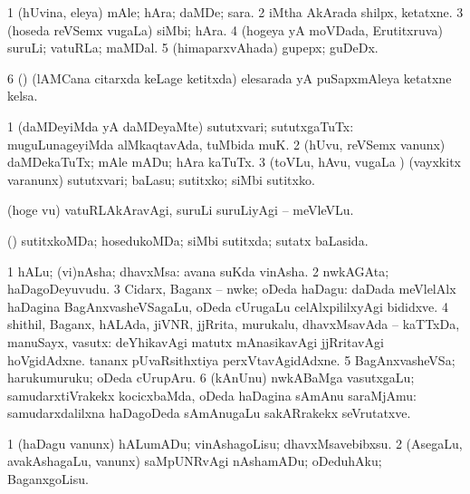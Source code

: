 {{{{{{\begin{center}
{{\bentry
{} 
\gl{\nA}
\bmng
\bnum
\num{1} (hUvina, eleya) mAle; hAra; daMDe; sara. 
\num{2} iMtha AkArada shilpx, ketatxne. 
\num{3} (hoseda reVSemx \mo vugaLa) siMbi; hAra. 
\num{4} (hogeya yA moVDada, Erutitxruva) suruLi; vatuRLa; maMDal. 
\num{5} (himaparxvAhada) gupepx; guDeDx. 
\num{6} (\vaMlAM) (lAMCana citarxda keLage ketitxda) elesarada yA puSapxmAleya ketatxne kelsa. 
\enum
\emng
\eentry

\bentry 
{} 
\gl{\sakirx}
\expl{}
\bmng
\bnum
\num{1} (daMDeyiMda yA daMDeyaMte) sututxvari; sututxgaTuTx:  muguLunageyiMda alMkaqtavAda, tuMbida muK. 
\num{2} (hUvu, reVSemx \mo vanunx) daMDekaTuTx; mAle mADu; hAra kaTuTx. 
\num{3} (toVLu, hAvu, \mo vugaLa \vi) (vayxkitx \mo varanunx) sututxvari; baLasu; sutitxko; siMbi sutitxko. 
\enum
\emng

\noindent
\gl{\akirx}
\expl{}
\bmng
(hoge \mo vu) vatuRLAkAravAgi, suruLi suruLiyAgi -- meVleVLu. 
\emng
\eentry

\bentry
{} 
\gl{\gu}
\expl{}
\bmng
(\pArxparx) sutitxkoMDa; hosedukoMDa; siMbi sutitxda; sutatx baLasida. 
\emng
\eentry

\bentry
{} 
\gl{\nA}
\expl{}
\bmng
\bnum
\num{1} hALu; (vi)nAsha; dhavxMsa:  avana suKda vinAsha. 
\num{2} nwkAGAta; haDagoDeyuvudu. 
\num{3} Cidarx, Baganx -- nwke; oDeda haDagu:  daDada meVlelAlx haDagina BagAnxvasheVSagaLu, oDeda cUrugaLu celAlxpililxyAgi bididxve. 
\num{4} shithil, Baganx, hALAda, jiVNR, jjRrita, murukalu, dhavxMsavAda -- kaTTxDa, manuSayx, vasutx:  deYhikavAgi matutx mAnasikavAgi jjRritavAgi hoVgidAdxne.  tananx pUvaRsithxtiya perxVtavAgidAdxne. 
\num{5} BagAnxvasheVSa; harukumuruku; oDeda cUrupAru. 
\num{6} (kAnUnu) nwkABaMga vasutxgaLu; samudarxtiVrakekx kocicxbaMda, oDeda haDagina sAmAnu saraMjAmu:  samudarxdalilxna haDagoDeda sAmAnugaLu sakARrakekx seVrutatxve. 
\enum
\emng
\eentry

\bentry
{} 
\gl{\sakirx}
\expl{}
\bmng
\bnum
\num{1} (haDagu \mo vanunx) hALumADu; vinAshagoLisu; dhavxMsavebibxsu. 
\num{2} (AsegaLu, avakAshagaLu, \mo vanunx) saMpUNRvAgi nAshamADu; oDeduhAku; BaganxgoLisu. 
\enum
\emng

}}
\end{center}}}}}}}
